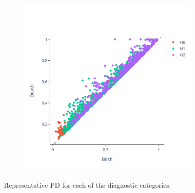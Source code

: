 \documentclass{article}
\begin{document}
\begin{figure}
\begin{subfigure}{0.3\textwidth}
  \end{subfigure}
  \begin{subfigure}{0.3\textwidth}
    \includegraphics[width=\textwidth]{figures/PDs/persistence_diagram_AD.png}
  \end{subfigure}
  \caption{Representative PD for each of the diagnostic categories.}
  \label{fig:sample_rep_pd}
\end{figure}
\end{document}
